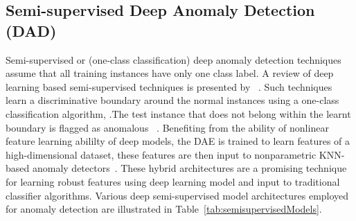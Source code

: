 \subsection{Semi-supervised Deep Anomaly Detection (DAD)}
\label{sec:semi_supervised_DAD}
Semi-supervised or (one-class classification) deep anomaly detection techniques assume that all training instances have only one class label.  A review of deep learning based semi-supervised techniques is presented by ~\cite{kiran2018overview,min2018ids}. Such techniques learn a discriminative boundary around the normal instances using a one-class classification algorithm,
.The test instance that does not belong within the learnt boundary is flagged as anomalous
~\cite{perera2018learning,blanchard2010semi}.
Benefiting from the ability of nonlinear feature learning abililty of deep models, the DAE is trained to learn features of a high-dimensional dataset, these features are then input to nonparametric KNN-based anomaly detectors~\cite{song2017hybrid}. These hybrid  architectures are a promising technique for learning robust features using deep learning model and input to traditional classifier algorithms. Various deep semi-supervised model architectures employed for anomaly detection are illustrated in Table~\ref{tab:semisupervisedModels}.

